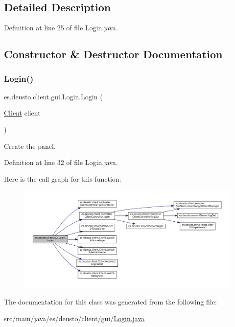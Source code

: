 \subsection{Detailed Description}


Definition at line 25 of file Login.\+java.



\subsection{Constructor \& Destructor Documentation}
\mbox{\label{classes_1_1deusto_1_1client_1_1gui_1_1_login_af565f7accded6e1e3d09b03d6baeaeb4}} 
\subsubsection{\texorpdfstring{Login()}{Login()}}
{\footnotesize\ttfamily es.\+deusto.\+client.\+gui.\+Login.\+Login (\begin{DoxyParamCaption}\item[{\mbox{\hyperlink{classes_1_1deusto_1_1client_1_1_client}{Client}}}]{client }\end{DoxyParamCaption})}

Create the panel. 

Definition at line 32 of file Login.\+java.

Here is the call graph for this function\+:
\nopagebreak
\begin{figure}[H]
\begin{center}
\leavevmode
\includegraphics[width=350pt]{classes_1_1deusto_1_1client_1_1gui_1_1_login_af565f7accded6e1e3d09b03d6baeaeb4_cgraph}
\end{center}
\end{figure}


The documentation for this class was generated from the following file\+:\begin{DoxyCompactItemize}
\item 
src/main/java/es/deusto/client/gui/\mbox{\hyperlink{_login_8java}{Login.\+java}}\end{DoxyCompactItemize}
